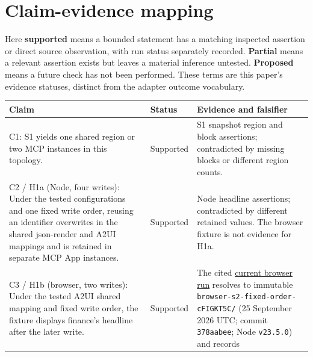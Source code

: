\documentclass[11pt]{article}
\newcounter{none}
\begin{document}
\section{Claim-evidence mapping}\label{claim-evidence-mapping}

Here \textbf{supported} means a bounded statement has a matching
inspected assertion or direct source observation, with run status
separately recorded. \textbf{Partial} means a relevant assertion exists
but leaves a material inference untested. \textbf{Proposed} means a
future check has not been performed. These terms are this paper's
evidence statuses, distinct from the adapter outcome vocabulary.

{\def\LTcaptype{none} %
\begin{longtable}[]{@{}
  >{\raggedright\arraybackslash}p{0.3800\dimexpr\linewidth-4\tabcolsep\relax}
  >{\raggedright\arraybackslash}p{0.1400\dimexpr\linewidth-4\tabcolsep\relax}
  >{\raggedright\arraybackslash}p{0.4800\dimexpr\linewidth-4\tabcolsep\relax}@{}}
\toprule\noalign{}
\begin{minipage}[b]{\linewidth}\raggedright
Claim
\end{minipage} & \begin{minipage}[b]{\linewidth}\raggedright
Status
\end{minipage} & \begin{minipage}[b]{\linewidth}\raggedright
Evidence and falsifier
\end{minipage} \\
\midrule\noalign{}
\endhead
\bottomrule\noalign{}
\endlastfoot
C1: S1 yields one shared region or two MCP instances in this topology. &
Supported & S1 snapshot region and block assertions; contradicted by
missing blocks or different region counts. \\
C2 / H1a (Node, four writes): Under the tested configurations and one
fixed write order, reusing an identifier overwrites in the shared
json-render and A2UI mappings and is retained in separate MCP App
instances. & Supported & Node headline assertions; contradicted by
different retained values. The browser fixture is not evidence for
H1a. \\
C3 / H1b (browser, two writes): Under the tested A2UI shared mapping and
fixed write order, the fixture displays finance's headline after the
later write. & Supported & The cited
\href{./evidence/current-browser-run/}{current browser run} resolves to
immutable \texttt{browser-s2-fixed-order-cFIGKT5C/} (25 September 2026
UTC; commit \texttt{378aabee}; Node \texttt{v23.5.0}) and records

\end{longtable}}
\end{document}
